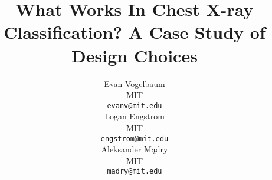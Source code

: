\documentclass{article}
\title{What Works In Chest X-ray Classification? A Case Study of Design Choices}
\author{%
  Evan Vogelbaum\\
  MIT\\
  \texttt{evanv@mit.edu} \\
  \And
  Logan Engstrom\\
  MIT\\
  \texttt{engstrom@mit.edu} \\
  \And
  Aleksander M\k{a}dry\\
  MIT\\
  \texttt{madry@mit.edu}
}
\begin{document}
\maketitle

\begin{abstract}
  
\end{abstract}














\newpage
\appendix

\end{document}
